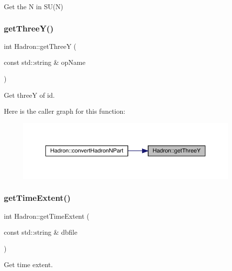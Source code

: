 Get the N in S\+U(\+N) 

\mbox{\label{namespaceHadron_a8739169b4caffa5f8bab802592b3302a}} 
\subsubsection{\texorpdfstring{getThreeY()}{getThreeY()}}
{\footnotesize\ttfamily int Hadron\+::get\+ThreeY (\begin{DoxyParamCaption}\item[{const std\+::string \&}]{op\+Name }\end{DoxyParamCaption})}



Get threeY of id. 

Here is the caller graph for this function\+:
\nopagebreak
\begin{figure}[H]
\begin{center}
\leavevmode
\includegraphics[width=350pt]{d1/daf/namespaceHadron_a8739169b4caffa5f8bab802592b3302a_icgraph}
\end{center}
\end{figure}
\mbox{\label{namespaceHadron_a660c9f3adc1525c9d326b23398d09494}} 
\subsubsection{\texorpdfstring{getTimeExtent()}{getTimeExtent()}}
{\footnotesize\ttfamily int Hadron\+::get\+Time\+Extent (\begin{DoxyParamCaption}\item[{const std\+::string \&}]{dbfile }\end{DoxyParamCaption})}



Get time extent. 

